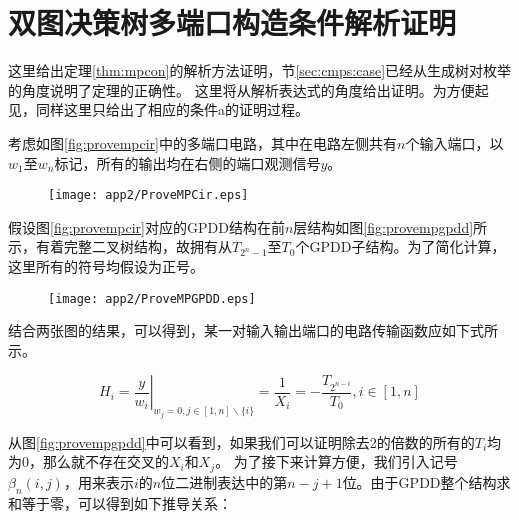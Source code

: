 
\chapter{双图决策树多端口构造条件解析证明}
\label{app:mpcon}

这里给出定理\ref{thm:mpcon}的解析方法证明，节\ref{sec:cmps:case}已经从生成树对枚举的角度说明了定理的正确性。
这里将从解析表达式的角度给出证明。为方便起见，同样这里只给出了相应的条件a的证明过程。

考虑如图\ref{fig:provempcir}中的多端口电路，其中在电路左侧共有$n$个输入端口，以$w_1$至$w_n$标记，所有的输出均在右侧的端口观测信号$y$。

\begin{figure}[!htp]
	\centering
	\texttt{[image: app2/ProveMPCir.eps]}
\end{figure}

假设图\ref{fig:provempcir}对应的GPDD结构在前$n$层结构如图\ref{fig:provempgpdd}所示，有着完整二叉树结构，故拥有从$T_{2^n-1}$至$T_0$个GPDD子结构。为了简化计算，这里所有的符号均假设为正号。

\begin{figure}[!htp]
	\centering
	\texttt{[image: app2/ProveMPGPDD.eps]}
\end{figure}

结合两张图的结果，可以得到，某一对输入输出端口的电路传输函数应如下式所示。

\begin{equation}
{H_i} = {\left. {\frac{y}
		{{{w_i}}}} \right|_{{w_j} = 0,j \in [1,n]\backslash \{ i\} }} = \frac{1}
{{{X_i}}} =  - \frac{{{T_{{2^{n - i}}}}}}
{{{T_0}}},i \in [1,n]
\end{equation}

从图\ref{fig:provempgpdd}中可以看到，如果我们可以证明除去2的倍数的所有的$T_i$均为0，那么就不存在交叉的$X_i$和$X_j$。
为了接下来计算方便，我们引入记号$\beta_n\left(i,j\right)$，用来表示$i$的$n$位二进制表达中的第$n-j+1$位。由于GPDD整个结构求和等于零，可以得到如下推导关系：

